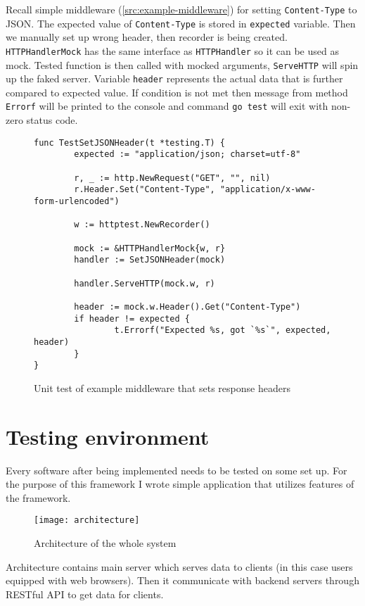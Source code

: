 Recall simple middleware (\ref{src:example-middleware}) for setting \verb|Content-Type| to JSON\@. The expected value of  \verb|Content-Type| is stored in \verb|expected| variable. Then we manually set up wrong header, then recorder is being created. \verb|HTTPHandlerMock| has the same interface as \verb|HTTPHandler| so it can be used as mock. Tested function is then called with mocked arguments, \verb|ServeHTTP| will spin up the faked server. Variable \verb|header| represents the actual data that is further compared to expected value. If condition is not met then message from method \verb|Errorf| will be printed to the console and command \verb|go test| will exit with non-zero status code.

\begin{figure}[!htbp]
\begin{verbatim}
func TestSetJSONHeader(t *testing.T) {
        expected := "application/json; charset=utf-8"

        r, _ := http.NewRequest("GET", "", nil)
        r.Header.Set("Content-Type", "application/x-www-form-urlencoded")

        w := httptest.NewRecorder()

        mock := &HTTPHandlerMock{w, r}
        handler := SetJSONHeader(mock)

        handler.ServeHTTP(mock.w, r)

        header := mock.w.Header().Get("Content-Type")
        if header != expected {
                t.Errorf("Expected %s, got `%s`", expected, header)
        }
}
\end{verbatim}
\renewcommand\figurename{Code}
\caption{Unit test of example middleware that sets response headers}
\label{src:test-example-middleware}
\end{figure}

\section{Testing environment}
Every software after being implemented needs to be tested on some set up. For the purpose of this framework I wrote simple application that utilizes features of the framework.

\begin{figure}[!htbp]
\centering
\texttt{[image: architecture]}
\label{fig:architecture}
\caption{Architecture of the whole system}
\end{figure}

Architecture contains main server which serves data to clients (in this case users equipped with web browsers). Then it communicate with backend servers through RESTful API to get data for clients.

